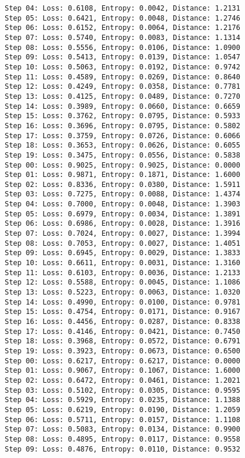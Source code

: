 \documentclass[11pt]{article}
\begin{document}
\begin{Verbatim}[commandchars=\\\{\}]
Step 04: Loss: 0.6108, Entropy: 0.0042, Distance: 1.2131
Step 05: Loss: 0.6421, Entropy: 0.0048, Distance: 1.2746
Step 06: Loss: 0.6152, Entropy: 0.0064, Distance: 1.2176
Step 07: Loss: 0.5740, Entropy: 0.0083, Distance: 1.1314
Step 08: Loss: 0.5556, Entropy: 0.0106, Distance: 1.0900
Step 09: Loss: 0.5413, Entropy: 0.0139, Distance: 1.0547
Step 10: Loss: 0.5063, Entropy: 0.0192, Distance: 0.9742
Step 11: Loss: 0.4589, Entropy: 0.0269, Distance: 0.8640
Step 12: Loss: 0.4249, Entropy: 0.0358, Distance: 0.7781
Step 13: Loss: 0.4125, Entropy: 0.0489, Distance: 0.7270
Step 14: Loss: 0.3989, Entropy: 0.0660, Distance: 0.6659
Step 15: Loss: 0.3762, Entropy: 0.0795, Distance: 0.5933
Step 16: Loss: 0.3696, Entropy: 0.0795, Distance: 0.5802
Step 17: Loss: 0.3759, Entropy: 0.0726, Distance: 0.6066
Step 18: Loss: 0.3653, Entropy: 0.0626, Distance: 0.6055
Step 19: Loss: 0.3475, Entropy: 0.0556, Distance: 0.5838
Step 00: Loss: 0.9025, Entropy: 0.9025, Distance: 0.0000
Step 01: Loss: 0.9871, Entropy: 0.1871, Distance: 1.6000
Step 02: Loss: 0.8336, Entropy: 0.0380, Distance: 1.5911
Step 03: Loss: 0.7275, Entropy: 0.0088, Distance: 1.4374
Step 04: Loss: 0.7000, Entropy: 0.0048, Distance: 1.3903
Step 05: Loss: 0.6979, Entropy: 0.0034, Distance: 1.3891
Step 06: Loss: 0.6986, Entropy: 0.0028, Distance: 1.3916
Step 07: Loss: 0.7024, Entropy: 0.0027, Distance: 1.3994
Step 08: Loss: 0.7053, Entropy: 0.0027, Distance: 1.4051
Step 09: Loss: 0.6945, Entropy: 0.0029, Distance: 1.3833
Step 10: Loss: 0.6611, Entropy: 0.0031, Distance: 1.3160
Step 11: Loss: 0.6103, Entropy: 0.0036, Distance: 1.2133
Step 12: Loss: 0.5588, Entropy: 0.0045, Distance: 1.1086
Step 13: Loss: 0.5223, Entropy: 0.0063, Distance: 1.0320
Step 14: Loss: 0.4990, Entropy: 0.0100, Distance: 0.9781
Step 15: Loss: 0.4754, Entropy: 0.0171, Distance: 0.9167
Step 16: Loss: 0.4456, Entropy: 0.0287, Distance: 0.8338
Step 17: Loss: 0.4146, Entropy: 0.0421, Distance: 0.7450
Step 18: Loss: 0.3968, Entropy: 0.0572, Distance: 0.6791
Step 19: Loss: 0.3923, Entropy: 0.0673, Distance: 0.6500
Step 00: Loss: 0.6217, Entropy: 0.6217, Distance: 0.0000
Step 01: Loss: 0.9067, Entropy: 0.1067, Distance: 1.6000
Step 02: Loss: 0.6472, Entropy: 0.0461, Distance: 1.2021
Step 03: Loss: 0.5102, Entropy: 0.0305, Distance: 0.9595
Step 04: Loss: 0.5929, Entropy: 0.0235, Distance: 1.1388
Step 05: Loss: 0.6219, Entropy: 0.0190, Distance: 1.2059
Step 06: Loss: 0.5711, Entropy: 0.0157, Distance: 1.1108
Step 07: Loss: 0.5083, Entropy: 0.0134, Distance: 0.9900
Step 08: Loss: 0.4895, Entropy: 0.0117, Distance: 0.9558
Step 09: Loss: 0.4876, Entropy: 0.0110, Distance: 0.9532

\end{Verbatim}
\end{document}
